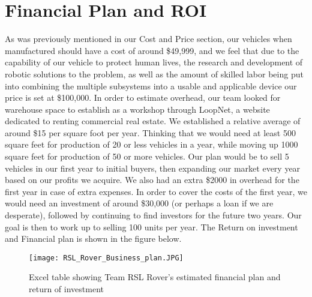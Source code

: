 \section{Financial Plan and ROI}

As was previously mentioned in our Cost and Price section, our vehicles when manufactured should have a cost of around \$49,999, and we feel that due to the capability of our vehicle to protect human lives, the research and development of robotic solutions to the problem, as well as the amount of skilled labor being put into combining the multiple subsystems into a usable and applicable device our price is set at \$100,000. In order to estimate overhead, our team looked for warehouse space to establish as a workshop through LoopNet, a website dedicated to renting commercial real estate. We established a relative average of around \$15 per square foot per year. Thinking that we would need at least 500 square feet for production of 20 or less vehicles in a year, while moving up 1000 square feet for production of 50 or more vehicles. Our plan would be to sell 5 vehicles in our first year to initial buyers, then expanding our market every year based on our profits we acquire. We also had an extra \$2000 in overhead for the first year in case of extra expenses. In order to cover the costs of the first year, we would need an investment of around \$30,000 (or perhaps a loan if we are desperate), followed by continuing to find investors for the future two years. Our goal is then to work up to selling 100 units per year. The Return on investment and Financial plan is shown in the figure below.

\begin{figure}[h!]
	\begin{center}
		\texttt{[image: RSL\_Rover\_Business\_plan.JPG]}
		\caption{Excel table showing Team RSL Rover's estimated financial plan and return of investment}
		\label{fig:FinPlan}
	\end{center}
\end{figure}